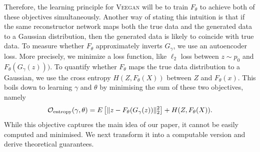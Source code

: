 \documentclass{article}
\newcommand{\acronym}{\textsc{Veegan}\xspace}
\newcommand{\comment}[1]{} %
\newcommand{\AS}[1]{\comment{\textcolor{BrickRed}{\textit{\lbrack AS: #1 \rbrack}}}}
\begin{document}
Therefore, the learning principle for \acronym
will be to train $F_\theta$ to achieve
both of these objectives simultaneously. 
Another way of stating this intuition is that
if the same reconstructor network maps both
the true data and the generated data to a Gaussian distribution, then the generated data
is likely to coincide with true data.
To measure whether $F_\theta$ approximately
inverts $G_\gamma$, we use an autoencoder loss.
 More precisely,  we 
minimize a loss function, like $\ell_2$ loss between $z \sim p_0$ 
and $F_\theta(G_\gamma(z)))$.
To quantify whether $F_\theta$ maps
the true data distribution to a Gaussian,
we use the cross entropy $H(Z, F_\theta(X))$ between $Z$ and
$F_\theta(x)$.
This  boils down to learning $\gamma$ and $\theta$ by
minimising the sum of these two objectives, namely
\begin{equation}
  \mathcal{O}_{\mathrm{entropy}}(\gamma,\theta) = E\left[\| z - F_\theta(G_\gamma(z))\|_2^2\right] + H(Z, F_\theta(X)).\label{eq:intuition}
\end{equation}
While this objective captures the main idea of our paper, it cannot be
easily computed and minimised. We next transform it into a
computable version and derive theoretical guarantees.


\end{document}
